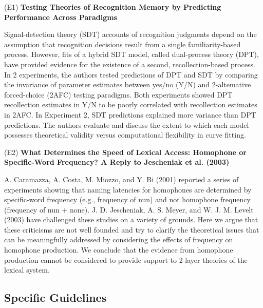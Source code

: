 \documentclass[a4paper,10pt]{article}
\newcommand{\exTit}[1]{\begin{tcolorbox}[enhanced,attach boxed title to top center={yshift=-3mm,yshifttext=-1mm},title=Examples,coltitle=black,colbacktitle=white]{#1}\end{tcolorbox}}
\begin{document}
\medskip
\exTit{
(E1) {\bf Testing Theories of Recognition Memory by Predicting Performance Across Paradigms} \par
\medskip
Signal-detection theory (SDT) accounts of recognition judgments depend on the assumption that recognition decisions result from a single familiarity-based process. However, fits of a hybrid SDT model, called dual-process theory (DPT), have provided evidence for the existence of a second, recollection-based process. In 2 experiments, the authors tested predictions of DPT and SDT by comparing the invariance of parameter estimates between yes/no (Y/N) and 2-altemative forced-choice (2AFC) testing paradigms. Both experiments showed DPT recollection estimates in Y/N to be poorly correlated with recollection estimates in 2AFC. In Experiment 2, SDT predictions explained more variance than DPT predictions. The authors evaluate and discuss the extent to which each model possesses theoretical validity versus computational flexibility in curve fitting.

\bigskip
(E2) {\bf What Determines the Speed of Lexical Access: Homophone or Specific-Word Frequency? A Reply to Jescheniak et al. (2003)} \par
\medskip
A. Caramazza, A. Costa, M. Miozzo, and Y. Bi (2001) reported a series of experiments showing that naming latencies for homophones are determined by specific-word frequency (e.g., frequency of nun) and not homophone frequency (frequency of nun + none). J. D. Jescheniak, A. S. Meyer, and W. J. M. Levelt (2003) have challenged these studies on a variety of grounds. Here we argue that these criticisms are not well founded and try to clarify the theoretical issues that can be meaningfully addressed by considering the effects of frequency on homophone production. We conclude that the evidence from homophone production cannot be considered to provide support to 2-layer theories of the lexical system.
}


\subsection{Specific Guidelines}
\label{ss:a_guidelines}
\end{document}

